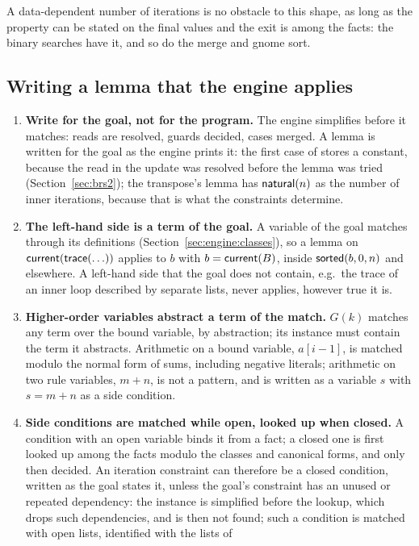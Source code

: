 A data-dependent number of iterations is no obstacle to this shape, as long as the property can be stated on the final
values and the exit is among the facts: the binary searches have it, and so do the merge and gnome sort.

\subsection{Writing a lemma that the engine applies}\label{sec:principles:matcher}
\begin{enumerate}[nosep]
\item \textbf{Write for the goal, not for the program.} The engine simplifies before it matches: reads are resolved,
  guards decided, cases merged. A lemma is written for the goal as the engine prints it: the first case of
   stores a constant, because the read in the update was resolved before the lemma was tried
  (Section~\ref{sec:brs2}); the transpose's lemma has $\mathsf{natural}(n)$ as the number of inner iterations, because that is what
  the constraints determine.
\item \textbf{The left-hand side is a term of the goal.} A variable of the goal matches through its definitions
  (Section~\ref{sec:engine:classes}), so a lemma on $\mathsf{current}(\mathsf{trace}(\ldots))$ applies to $b$ with $b = \mathsf{current}(B)$,
  inside $\mathsf{sorted}(b, 0, n)$ and elsewhere. A left-hand side that the goal does not contain, e.g.\ the trace of an inner
  loop described by separate lists, never applies, however true it is.
\item \textbf{Higher-order variables abstract a term of the match.} $G(k)$ matches any term over the bound variable,
  by abstraction; its instance must contain the term it abstracts. Arithmetic on a bound variable, $a[i - 1]$, is
  matched modulo the normal form of sums, including negative literals; arithmetic on two rule variables, $m + n$,
  is not a pattern, and is written as a variable $s$ with $s = m + n$ as a side condition.
\item \textbf{Side conditions are matched while open, looked up when closed.} A condition with an open variable binds it
  from a fact; a closed one is first looked up among the facts modulo the classes and canonical forms, and only then
  decided. An iteration constraint can therefore be a closed condition, written as the goal states it, unless the
  goal's constraint has an unused or repeated dependency: the instance is simplified before the lookup, which drops
  such dependencies, and is then not found; such a condition is matched with open lists, identified with the lists of

\end{enumerate}
